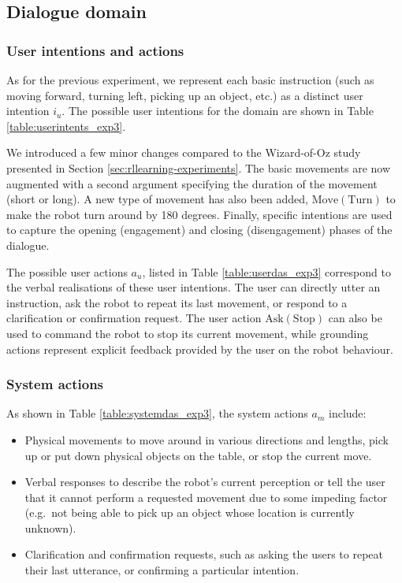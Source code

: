 \subsection{Dialogue domain}
\subsubsection*{User intentions and actions}
As for the previous experiment, we represent each basic instruction (such as moving forward, turning left, picking up an object, etc.) as a distinct user intention $i_u$. The possible user intentions for the domain are shown in Table \ref{table:userintents_exp3}.  

We introduced a few minor changes compared to the Wizard-of-Oz study presented in Section \ref{sec:rllearning-experiments}. The basic movements are now augmented with a second argument specifying the duration of the movement (short or long). A new type of movement has also been added, $\mathrm{Move(Turn)}$ to make the robot turn around by 180 degrees.  Finally, specific intentions are used to capture the opening (engagement) and closing (disengagement) phases of the dialogue. 

The possible user actions $a_u$, listed in Table \ref{table:userdas_exp3} correspond to the verbal realisations of these user intentions. The user can directly utter an instruction, ask the robot to repeat its last movement, or respond to a clarification or confirmation request.   The user action $\mathrm{Ask(Stop)}$ can also be used to command the robot to stop its current movement, while grounding actions represent explicit feedback provided by the user on the robot behaviour.

\subsubsection*{System actions}
As shown in Table \ref{table:systemdas_exp3}, the system actions $a_m$ include: \begin{itemize}
\item Physical movements to move around in various directions and lengths, pick up or put down physical objects on the table, or stop the current move.
\item Verbal responses to describe the robot's current perception or tell the user that it cannot perform a requested movement due to some impeding factor (e.g.\ not being able to pick up an object whose location is currently unknown). 
\item Clarification and confirmation requests, such as asking the users to repeat their last utterance, or confirming a particular intention.
\end{itemize}

